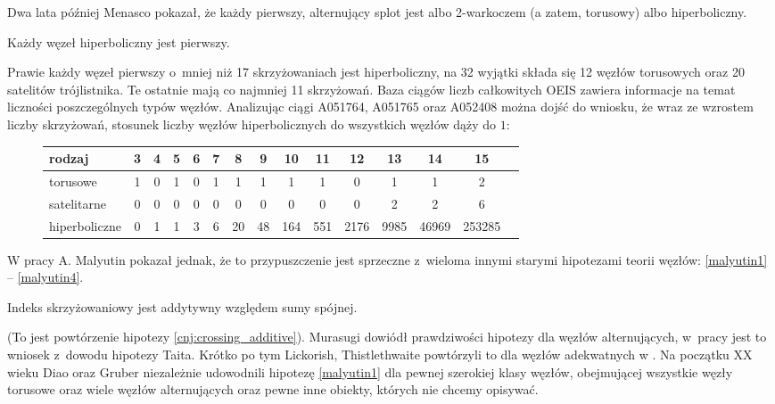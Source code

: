 Dwa lata później Menasco \cite{menasco84} pokazał, że każdy pierwszy, alternujący splot jest albo 2-warkoczem (a zatem, torusowy) albo hiperboliczny.

\begin{corollary}
    Każdy węzeł hiperboliczny jest pierwszy.
\end{corollary}

Prawie każdy węzeł pierwszy o~mniej niż 17 skrzyżowaniach jest hiperboliczny, na 32 wyjątki składa się 12 węzłów torusowych oraz 20 satelitów trójlistnika.
Te ostatnie mają co najmniej 11 skrzyżowań.
Baza ciągów liczb całkowitych OEIS zawiera informacje na temat liczności poszczególnych typów węzłów.
Analizując ciągi A051764, A051765 oraz A052408 można dojść do wniosku, że wraz ze wzrostem liczby skrzyżowań, stosunek liczby węzłów hiperbolicznych do wszystkich węzłów dąży do $1$:

\begin{figure}[H]
\renewcommand*{\arraystretch}{1.4}
\footnotesize
\begin{longtable}{lcccccccccccccc}
\hline
    \textbf{rodzaj} & 3 & 4 & 5 & 6 & 7 & 8  & 9  & 10  & 11  & 12   & 13   & 14    & 15     \\ \hline \endhead
    torusowe        & 1 & 0 & 1 & 0 & 1 & 1  & 1  & 1   & 1   & 0    & 1    & 1     & 2      \\
    satelitarne     & 0 & 0 & 0 & 0 & 0 & 0  & 0  & 0   & 0   & 0    & 2    & 2     & 6      \\
    hiperboliczne   & 0 & 1 & 1 & 3 & 6 & 20 & 48 & 164 & 551 & 2176 & 9985 & 46969 & 253285 \\
    \hline
\end{longtable}
\normalsize
\end{figure}

W pracy \cite{malyutin16} A. Malyutin pokazał jednak, że to przypuszczenie jest sprzeczne z~wieloma innymi starymi hipotezami teorii węzłów: \ref{malyutin1} -- \ref{malyutin4}.

\begin{conjecture}
    \label{malyutin1}
    Indeks skrzyżowaniowy jest addytywny względem sumy spójnej.
\end{conjecture}

(To jest powtórzenie hipotezy \ref{cnj:crossing_additive}).
Murasugi dowiódł prawdziwości hipotezy dla węzłów alternujących, w~pracy \cite{murasugi87} jest to wniosek z~dowodu hipotezy Taita.
Krótko po tym Lickorish, Thistlethwaite powtórzyli to dla węzłów adekwatnych w \cite{lickorish88}.
Na początku XX wieku Diao \cite{diao04} oraz Gruber \cite{gruber03} niezależnie udowodnili hipotezę \ref{malyutin1} dla pewnej szerokiej klasy węzłów, obejmującej wszystkie węzły torusowe oraz wiele węzłów alternujących oraz pewne inne obiekty, których nie chcemy opisywać.

